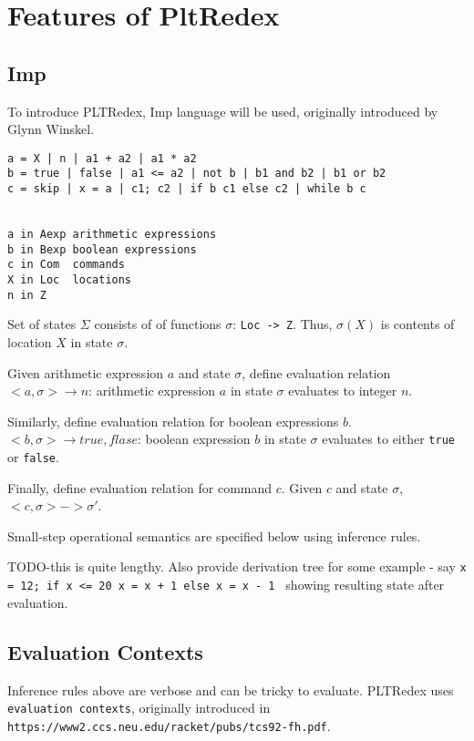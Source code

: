 \chapter{Features of PltRedex}

\section{Imp}

To introduce PLTRedex, Imp language will be used, originally introduced by Glynn Winskel.

\begin{lstlisting}
a = X | n | a1 + a2 | a1 * a2
b = true | false | a1 <= a2 | not b | b1 and b2 | b1 or b2
c = skip | x = a | c1; c2 | if b c1 else c2 | while b c


a in Aexp arithmetic expressions
b in Bexp boolean expressions
c in Com  commands 
X in Loc  locations
n in Z
\end{lstlisting}

Set of states $\Sigma$ consists of of functions $\sigma$: \texttt{Loc -> Z}. Thus, $\sigma(X)$ is contents of location $X$ in state $\sigma$. 

Given arithmetic expression $a$ and state $\sigma$, define evaluation relation $<a,\sigma> \rightarrow n$: arithmetic expression $a$ in state $\sigma$ evaluates to integer $n$.

Similarly, define evaluation relation for boolean expressions $b$. $<b, \sigma> \rightarrow {true, flase}$: boolean expression $b$ in state $\sigma$ evaluates to either \texttt{true} or \texttt{false}.

Finally, define evaluation relation for command $c$. Given $c$ and state $\sigma$, $<c, \sigma> -> \sigma\prime$. 

Small-step operational semantics are specified below using inference rules.

TODO-this is quite lengthy. Also provide derivation tree for some example - say \texttt{x = 12; if x <= 20 x = x + 1 else x = x - 1 } showing resulting state after evaluation.


\section{Evaluation Contexts}

Inference rules above are verbose and can be tricky to evaluate. PLTRedex uses \texttt{evaluation contexts}, originally introduced in \texttt{https://www2.ccs.neu.edu/racket/pubs/tcs92-fh.pdf}. 

